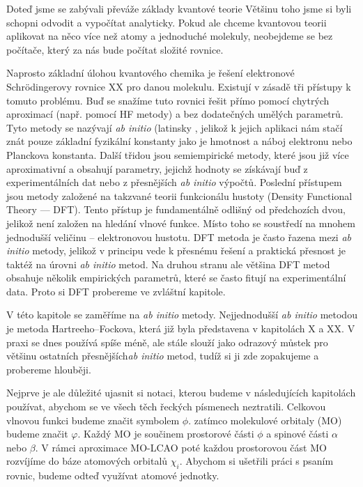 Doteď jsme se zabývali převáže základy kvantové teorie 
Většinu toho jsme si byli schopni odvodit a vypočítat analyticky. 
Pokud ale chceme kvantovou teorii aplikovat na něco více než atomy a jednoduché molekuly,
neobejdeme se bez počítače, který za nás bude počítat složité rovnice.

Naprosto základní úlohou kvantového chemika je řešení elektronové Schr\"{o}dingerovy rovnice XX pro danou molekulu. Existují v zásadě tři přístupy k tomuto problému. Buď se snažíme tuto rovnici řešit přímo pomocí chytrých aproximací (např. pomocí HF metody) a bez dodatečných umělých parametrů. Tyto metody se nazývají \textit{ab initio} (latinsky , jelikož k jejich aplikaci nám stačí znát pouze základní fyzikální konstanty jako je hmotnost a náboj elektronu nebo Planckova konstanta. Další třidou jsou semiempirické metody, které jsou již více aproximativní a obsahují parametry, jejichž hodnoty se získávají buď z experimentálních dat nebo z přesnějších \textit{ab initio} výpočtů. Poslední přístupem jsou metody založené na takzvané teorii funkcionálu hustoty (Density Functional Theory --- DFT). Tento přístup je fundamentálně odlišný od předchozích dvou, jelikož není založen na hledání vlnové funkce. Místo toho se soustředí na mnohem jednodušší veličinu -- elektronovou hustotu. DFT metoda je často řazena mezi \textit{ab initio} metody, jelikož v principu vede k přesnému řešení a praktická přesnost je taktéž na úrovni \textit{ab initio} metod. Na druhou stranu ale většina DFT metod obsahuje několik empirických parametrů, které se často fitují na experimentální data. Proto si DFT probereme ve zvláštní kapitole.  

V této kapitole se zaměříme na \textit{ab initio} metody.
Nejjednodušší \textit{ab initio} metodou je metoda Hartreeho--Fockova, která již byla představena v kapitolách X a XX. V praxi se dnes používá spíše méně, ale stále slouží jako odrazový můstek pro většinu ostatních přesnějších\textit{ab initio} metod, tudíž si ji zde zopakujeme a probereme hlouběji.

Nejprve je ale důležité ujasnit si notaci, kterou budeme v následujících kapitolách používat, abychom se ve všech těch řeckých písmenech neztratili. Celkovou vlnovou funkci budeme značit symbolem $\phi$.  zatímco molekulové orbitaly (MO) budeme značit $\varphi$. Každý MO je součinem prostorové části $\phi$ a spinové části $\alpha$ nebo $\beta$. V rámci aproximace MO-LCAO poté každou prostorovou část MO rozvíjíme do báze atomových orbitalů $\chi_i$. Abychom si ušetřili práci s psaním rovnic, budeme odteď využívat atomové jednotky.


